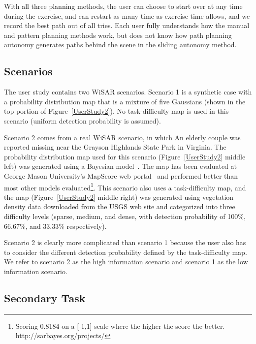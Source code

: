 With all three planning methods, the user can choose to start over at any time during the exercise, and can restart as many time as exercise time allows, and we record the best path out of all tries. Each user fully understands how the manual and pattern planning methods work, but does not know how path planning autonomy generates paths behind the scene in the sliding autonomy method.

\subsection{Scenarios}

The user study contains two WiSAR scenarios. Scenario 1 is a synthetic case with a probability distribution map that is a mixture of five Gaussians (shown in the top portion of Figure~\ref{UserStudy2}). No task-difficulty map is used in this scenario (uniform detection probability is assumed). 

Scenario 2 comes from a real WiSAR scenario, in which An elderly couple was reported missing near the Grayson Highlands State Park in Virginia. The probability distribution map used for this scenario (Figure~\ref{UserStudy2} middle left) was generated using a Bayesian model~\cite{Lin2010Bayesian}. The map has been evaluated at George Mason University's MapScore web portal~\cite{Twardy2012MapScore} and performed better than most other models evaluated\footnote{Scoring 0.8184 on a [-1,1] scale where the higher the score the better. http://sarbayes.org/projects/}. This scenario also uses a task-difficulty map, and the map (Figure~\ref{UserStudy2} middle right) was generated using vegetation density data downloaded from the USGS web site and categorized into three difficulty levels (sparse, medium, and dense, with detection probability of 100\%, 66.67\%, and 33.33\% respectively).

Scenario 2 is clearly more complicated than scenario 1 because the user also has to consider the different detection probability defined by the task-difficulty map. We refer to scenario 2 as the high information scenario and scenario 1 as the low information scenario.

\subsection{Secondary Task}

